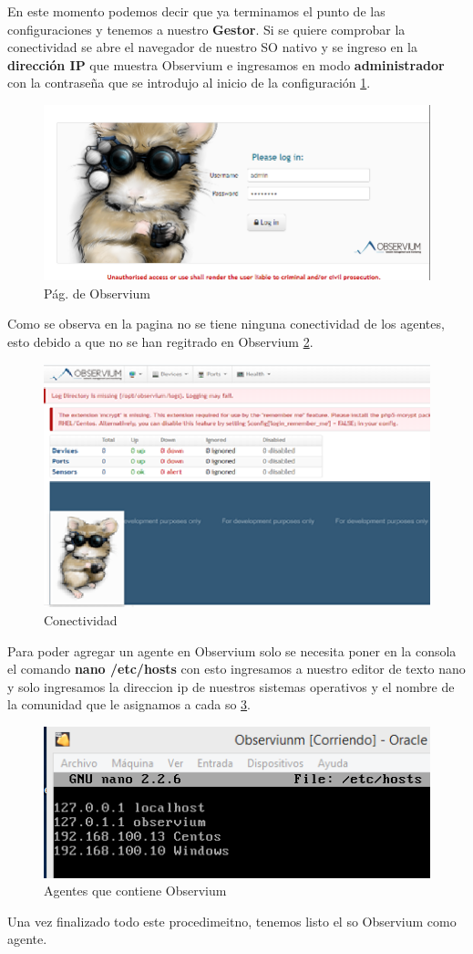 \documentclass[10pt,a4paper]{book}
\begin{document}
En este momento podemos decir que ya terminamos el punto de las configuraciones y tenemos a nuestro \textbf{Gestor}.
Si  se quiere comprobar la  conectividad se abre el navegador de nuestro SO nativo y se ingreso en la \textbf{dirección IP} que muestra Observium e ingresamos en modo \textbf{administrador} con la contraseña que se  introdujo al inicio de la configuración \ref{image:observium}.

\FloatBarrier
\begin{figure}[htbp!]
		\centering
			\includegraphics[width=.5 \textwidth]{../images/3-Observium.png}
		\caption{Pág. de Observium}
		\label{image:observium}
\end{figure}
\FloatBarrier

Como se observa en la pagina no se tiene ninguna conectividad de los agentes, esto debido a que no se han regitrado en Observium \ref{image:pag}.

\FloatBarrier
\begin{figure}[htbp!]
		\centering
			\includegraphics[width=.7 \textwidth]{../images/4-Observium.png}
		\caption{Conectividad}
		\label{image:pag}
\end{figure}
\FloatBarrier

Para poder agregar un agente en Observium solo se necesita poner en la consola el comando \textbf{nano /etc/hosts} con esto ingresamos a nuestro editor de texto nano y solo ingresamos la direccion ip de nuestros sistemas operativos y el nombre de la comunidad que le asignamos a cada so \ref{image:agente}.

\FloatBarrier
\begin{figure}[htbp!]
		\centering
			\includegraphics[width=.5 \textwidth]{../images/5-Observium.png}
		\caption{Agentes que contiene Observium}
		\label{image:agente}
\end{figure}
\FloatBarrier

Una vez finalizado todo este procedimeitno, tenemos listo el so Observium como agente.
\end{document}
